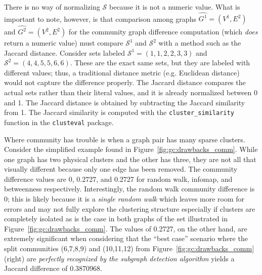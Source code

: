 There is no way of normalizing $\mathcal{S}$ because it is not a numeric 
value. What is important to note, however, is that comparison among 
graphs $\hat{G^1}=(V^1,E^2)$ and $\hat{G^2}=(V^2,E^2)$ for the community graph 
difference computation (which \textit{does} return a numeric value)
must compare $\mathcal{S}^1$ and $\mathcal{S}^2$ with a method such as the 
Jaccard distance. Consider sets labeled $\mathcal{S}^1=(1,1,2,2,3,3)$ and 
$\mathcal{S}^2=(4,4,5,5,6,6)$. These are the exact same sets, but 
they are labeled with different values; thus, a traditional distance metric 
(e.g. Euclidean distance) would not capture the difference properly. 
The Jaccard distance compares the actual sets rather than their literal values, 
and it is already normalized between 0 and 1.
The Jaccard distance is obtained by subtracting the Jaccard similarity from 1. 
The Jaccard similarity is computed with the \texttt{cluster\_similarity} 
function in the \texttt{clusteval} package.

Where community has trouble is when a graph pair has many sparse clusters. 
Consider the simplified example found in Figure~\ref{fig:gc:drawbacks_comm}. 
While one graph has two physical clusters and the other has three, they are not 
all that visually different because only one edge has been removed. The 
community difference values are 0, 0.2727, and 0.2727 for random walk, infomap, 
and betweenness respectively.
Interestingly, the random walk community difference is 0; this is 
likely because it is a \textit{single random walk} which leaves more room for 
errors and may not fully explore the clustering structure especially if 
clusters are completely isolated as is the case in both graphs of the set 
illustrated in Figure~\ref{fig:gc:drawbacks_comm}. 
The values of 0.2727, on the other hand, are extremely significant when 
considering that the ``best case'' scenario where the split communities 
(6,7,8,9) and (10,11,12) from Figure~\ref{fig:gc:drawbacks_comm} (right) are 
\textit{perfectly recognized by the subgraph detection algorithm} yields a 
Jaccard difference of 0.3870968. 










